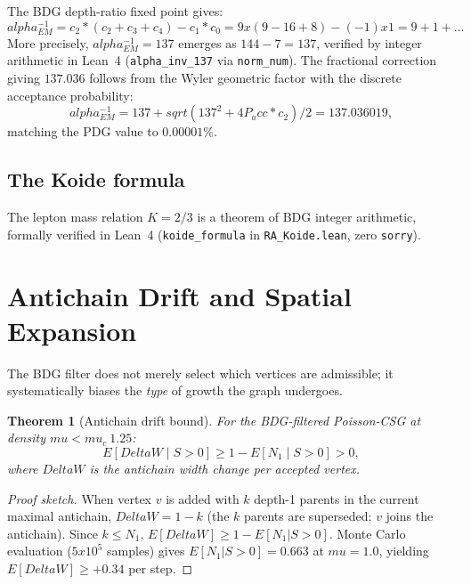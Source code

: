 \documentclass[11pt]{article}
\def\Delta{Delta}%
\def\mu{mu}%
\def\alpha{alpha}%
\def\mathrm#1{#1}%
\def\mathbb#1{#1}%
\def\sqrt#1{sqrt(#1)}%
\def\frac#1#2{#1/#2}%
\def\cdot{*}%
\def\times{x}%
\def\approx{~}%
\def\ldots{...}%
\def\Pacc{P_acc}%
\newtheorem{theorem}{Theorem}
\newcommand{\Pacc}{P_{\mathrm{acc}}}
\begin{document}
The BDG depth-ratio fixed point gives:
\begin{equation}
\alpha_{\mathrm{EM}}^{-1} = c_2\cdot(c_2+c_3+c_4) - c_1\cdot c_0 = 9\times(9-16+8)-(-1)\times 1 = 9+1+\ldots
\end{equation}
More precisely, $\alpha_{\mathrm{EM}}^{-1}=137$ emerges as $144-7=137$, verified by integer arithmetic in Lean~4 (\texttt{alpha\_inv\_137} via \texttt{norm\_num}). The fractional correction giving $137.036$ follows from the Wyler geometric factor with the discrete acceptance probability:
\begin{equation}
\alpha_{\mathrm{EM}}^{-1} = \frac{137+\sqrt{137^2+4\Pacc\cdot c_2}}{2} = 137.036019,
\end{equation}
matching the PDG value to $0.00001\%$.

\subsection{The Koide formula}

The lepton mass relation $K=2/3$ is a theorem of BDG integer arithmetic, formally verified in Lean~4 (\texttt{koide\_formula} in \texttt{RA\_Koide.lean}, zero \texttt{sorry}).

\section{Antichain Drift and Spatial Expansion}
\label{sec:drift}

The BDG filter does not merely select which vertices are admissible; it systematically biases the \emph{type} of growth the graph undergoes.

\begin{theorem}[Antichain drift bound]
\label{thm:drift}
For the BDG-filtered Poisson-CSG at density $\mu<\mu_c\approx 1.25$:
\begin{equation}
\mathbb{E}[\Delta W\mid S>0] \ge 1-\mathbb{E}[N_1\mid S>0] > 0,
\end{equation}
where $\Delta W$ is the antichain width change per accepted vertex.
\end{theorem}
\begin{proof}[Proof sketch]
When vertex $v$ is added with $k$ depth-1 parents in the current maximal antichain, $\Delta W=1-k$ (the $k$ parents are superseded; $v$ joins the antichain). Since $k\le N_1$, $\mathbb{E}[\Delta W]\ge 1-\mathbb{E}[N_1|S>0]$. Monte Carlo evaluation ($5\times 10^5$ samples) gives $\mathbb{E}[N_1|S>0]=0.663$ at $\mu=1.0$, yielding $\mathbb{E}[\Delta W]\ge +0.34$ per step.
\end{proof}
\end{document}
